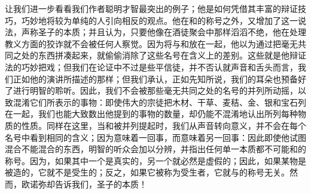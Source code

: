 让我们进一步看看我们作者聪明才智最突出的例子；他是如何凭借其丰富的辩证技巧，巧妙地将较为单纯的人引向相反的观点。他在和的称号之外，又增加了这一说法，声称圣子的本质；并且认为，只要他像在酒徒聚会中那样滔滔不绝，他在处理教义方面的狡诈就不会被任何人察觉。因为将与和放在一起，他以为通过把毫无共同之处的东西拼凑起来，就偷偷消除了这些名号在含义上的差别。这些就是他辩证法的巧妙把戏；但我们在论证中不过是些平信徒，并不否认就声音和舌头而言，我们正如他的演讲所描述的那样；但我们承认，正如先知所说，我们的耳朵也预备好了进行明智的聆听。因此，我们不会被那些毫无共同之处的名号的并列所动摇，以致混淆它们所表示的事物：即使伟大的宗徒把木材、干草、麦秸、金、银和宝石列在一起，我们也能大致数出他提到的事物的数量，却仍能不混淆地认出所列每种物质的性质。同样在这里，当和被并列提起时，我们从声音转向意义，并不会在每个名号中看到相同的含义；因为意味着一回事，而意味着另一回事：因此即使他试图混合不能混合的东西，明智的听众会加以分辨，并指出任何单一本质都不可能和的称号。因为，如果其中一个是真实的，另一个就必然是虚假的；因此，如果某物是被造的，它就不是受生的；反之，如果它被称为受生者，它就与的称号无关。然而，欧诺弥却告诉我们，圣子的本质！\par

